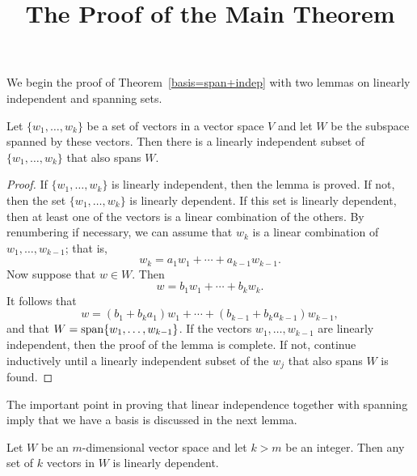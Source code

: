 \documentclass{ximera}
\title{The Proof of the Main Theorem}
\begin{document}
\begin{abstract}
\end{abstract}
\maketitle

 \label{S:5.6}

We begin the proof of Theorem~\ref{basis=span+indep} with two
lemmas on linearly independent and spanning sets.

\begin{lemma}  \label{reducetoindep}
Let $\{w_1,\ldots,w_k\}$ be a set of vectors in a vector space
$V$ and let $W$ be the subspace spanned by these vectors.  Then
there is a linearly independent subset of $\{w_1,\ldots,w_k\}$
that also spans $W$.
\end{lemma}

\begin{proof} If $\{w_1,\ldots,w_k\}$ is linearly independent, then the
lemma is proved.  If not, then the set $\{w_1,\ldots,w_k\}$ is
linearly dependent.  If this set is linearly dependent, then at
least one of the vectors is a linear combination of the others.
By renumbering if necessary, we can assume that $w_k$ is a
linear combination of $w_1,\ldots,w_{k-1}$; that is,
\[
w_k = a_1w_1 + \cdots + a_{k-1}w_{k-1}.
\]
Now suppose that $w\in W$.  Then
\[
w = b_1w_1 + \cdots + b_kw_k.
\]
It follows that
\[
w = (b_1+b_ka_1)w_1 + \cdots + (b_{k-1}+b_ka_{k-1})w_{k-1},
\]
and that $W={\rm span}\{w_1,\ldots,w_{k-1}\}$.  If the vectors
$w_1,\ldots,w_{k-1}$ are linearly independent, then the proof of
the lemma is complete.  If not, continue inductively until a
linearly independent subset of the $w_j$ that also spans $W$ is
found.  \end{proof}

The important point in proving that linear independence together
with spanning imply that we have a basis is discussed in the next
lemma.

\begin{lemma}  \label{lem:lindep}
Let $W$ be an $m$-dimensional vector space and let $k>m$ be an integer.
Then any set of $k$ vectors in $W$ is linearly dependent.
\end{lemma} 
\end{document}
